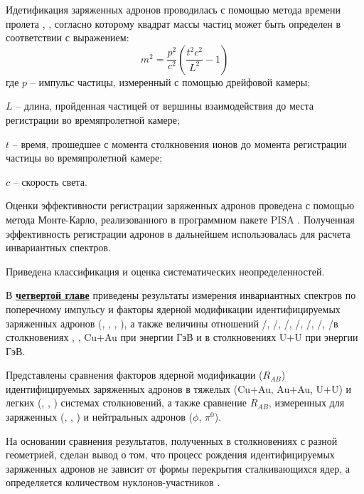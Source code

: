 Идетификация заряженных адронов проводилась с помощью метода времени пролета \autocite{nucleus2020}, \cite{PPG026, ppg146}, согласно которому квадрат массы частиц может быть определен в соответствии с выражением: 
$$m^2 = \frac{p^2}{c^2} \left(  \frac{t^2 c^2}{L^2} - 1\right)$$
где $p$ -- импульс частицы, измеренный с помощью дрейфовой камеры; 

$L$ -- длина, пройденная частицей от вершины взаимодействия до места регистрации во времяпролетной камере; 

$t$ -- время, прошедшее с момента столкновения ионов до момента регистрации частицы во времяпролетной камере; 

$c$ -- скорость света.

Оценки эффективности регистрации заряженных адронов проведена с помощью метода Монте-Карло, реализованного в программном пакете PISA \cite{PISA}. Полученная эффективность регистрации адронов в дальнейшем использовалась для расчета инвариантных спектров. 

Приведена классификация и оценка систематических неопределенностей. %

\begin{comment}
Формулы в строку без номера добавляются так:
\[
    \lambda_{T_s} = K_x\frac{d{x}}{d{T_s}}, \qquad
    \lambda_{q_s} = K_x\frac{d{x}}{d{q_s}},
\]
\end{comment}

В \underline{\textbf{четвертой главе}} приведены результаты измерения инвариантных спектров по поперечному импульсу и факторы ядерной модификации идентифицируемых заряженных адронов (\pipm, \Kpm, \prot, \aprot), а также величины отношений \pim/\pip, \Km/\Kp, \prot/\aprot, \prot/\pip, \aprot/\pim, \Kp/\pip, \Km/\pim в столкновениях  \pal, \heau, Cu+Au при энергии  ГэВ и в столкновениях U+U при энергии  ГэВ. 

Представлены сравнения факторов ядерной модификации ($R_{AB}$) идентифицируемых заряженных адронов в тяжелых (Cu+Au, Au+Au, U+U) и легких (\pal, \dau, \heau) системах столкновений, а также сравнение $R_{AB}$, измеренных для заряженных (\pipm, \Kpm, \prots) и нейтральных адронов ($\phi$, $\pi^{0}$).

На основании сравнения результатов, полученных в столкновениях с разной геометрией, сделан вывод о том, что процесс рождения идентифицируемых заряженных адронов не зависит от формы перекрытия сталкивающихся ядер, а определяется количеством нуклонов-участников \Npart.

